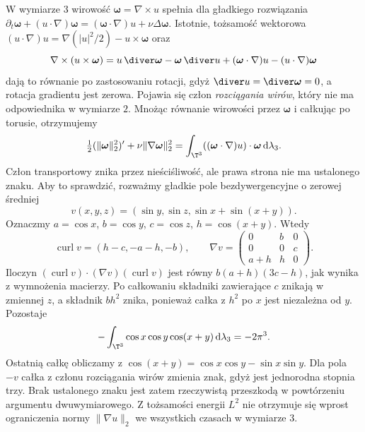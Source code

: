 \begin{uwaga}
W wymiarze $3$ wirowość $\boldsymbol\omega=\nabla\times u$
spełnia dla gładkiego rozwiązania
$\partial_t\boldsymbol\omega+(u\cdot\nabla)\boldsymbol\omega
=(\boldsymbol\omega\cdot\nabla)u+\nu\Delta\boldsymbol\omega$.
Istotnie, tożsamość wektorowa
$(u\cdot\nabla)u=\nabla(|u|^2/2)-u\times\boldsymbol\omega$
oraz
\[
 \nabla\times(u\times\boldsymbol\omega)
 =u\,\diver\boldsymbol\omega-\boldsymbol\omega\,\diver u
 +(\boldsymbol\omega\cdot\nabla)u
 -(u\cdot\nabla)\boldsymbol\omega
\]
dają to równanie po zastosowaniu rotacji,
gdyż $\diver u=\diver\boldsymbol\omega=0$,
a rotacja gradientu jest zerowa.
Pojawia się człon \emph{rozciągania wirów}, który nie ma
odpowiednika w wymiarze $2$. Mnożąc równanie
wirowości przez $\boldsymbol\omega$ i całkując
po torusie, otrzymujemy
\[
 \tfrac12(\|\boldsymbol\omega\|_2^2)'
 +\nu\|\nabla\boldsymbol\omega\|_2^2
 =\int_{\T^3}((\boldsymbol\omega\cdot\nabla)u)
 \cdot\boldsymbol\omega\,\mathrm d\lambda_3.
\]
Człon transportowy znika przez nieściśliwość,
ale prawa strona nie ma ustalonego znaku.
Aby to sprawdzić, rozważmy gładkie pole
bezdywergencyjne o zerowej średniej
\[
 v(x,y,z)=(\sin y,\sin z,\sin x+\sin(x+y)).
\]
Oznaczmy $a=\cos x$, $b=\cos y$, $c=\cos z$,
$h=\cos(x+y)$. Wtedy
\[
 \operatorname{curl}v=(h-c,-a-h,-b),\qquad
 \nabla v=\begin{pmatrix}0&b&0\\0&0&c\\a+h&h&0\end{pmatrix}.
\]
Iloczyn $(\operatorname{curl}v)\cdot
(\nabla v)(\operatorname{curl}v)$ jest równy
$b(a+h)(3c-h)$, jak wynika z wymnożenia macierzy.
Po całkowaniu składniki zawierające $c$ znikają
w zmiennej $z$, a składnik $bh^2$ znika, ponieważ
całka z $h^2$ po $x$ jest niezależna od $y$.
Pozostaje
\[
 -\int_{\T^3}\cos x\cos y\cos(x+y)\,
 \mathrm d\lambda_3=-2\pi^3.
\]
Ostatnią całkę obliczamy z
$\cos(x+y)=\cos x\cos y-\sin x\sin y$.
Dla pola $-v$ całka z członu rozciągania wirów
zmienia znak, gdyż jest jednorodna stopnia trzy.
Brak ustalonego znaku jest zatem rzeczywistą
przeszkodą w powtórzeniu argumentu dwuwymiarowego. Z tożsamości energii $L^2$
nie otrzymuje się wprost ograniczenia normy $\|\nabla u\|_2$
we wszystkich czasach w wymiarze $3$.
\end{uwaga}

